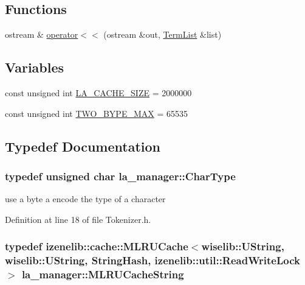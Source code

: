 \subsection*{Functions}
\begin{CompactItemize}
\item 
ostream \& \hyperlink{namespacela__manager_85370bde9cbbf78fdda59928e482fb4b}{operator$<$$<$} (ostream \&out, \hyperlink{namespacela__manager_06c0aab93982ee3ebc3ef9d0419e619a}{TermList} \&list)
\end{CompactItemize}
\subsection*{Variables}
\begin{CompactItemize}
\item 
const unsigned int \hyperlink{namespacela__manager_a750d488a0f8a7f20ba3a0adf64b44c4}{LA\_\-CACHE\_\-SIZE} = 2000000
\item 
const unsigned int \hyperlink{namespacela__manager_209bf4bd6bbc83558619fa8b8f6dc451}{TWO\_\-BYPE\_\-MAX} = 65535
\end{CompactItemize}


\subsection{Typedef Documentation}
\hypertarget{namespacela__manager_aa4b42b4146948a208eabd25288ad99b}{
\subsubsection[{CharType}]{\setlength{\rightskip}{0pt plus 5cm}typedef unsigned char {\bf la\_\-manager::CharType}}}
\label{namespacela__manager_aa4b42b4146948a208eabd25288ad99b}


use a byte a encode the type of a character 



Definition at line 18 of file Tokenizer.h.\hypertarget{namespacela__manager_8a93c4bd160d94957812fb620225a17e}{
\subsubsection[{MLRUCacheString}]{\setlength{\rightskip}{0pt plus 5cm}typedef izenelib::cache::MLRUCache$<$wiselib::UString, wiselib::UString, {\bf StringHash}, izenelib::util::ReadWriteLock$>$ {\bf la\_\-manager::MLRUCacheString}}}
\label{namespacela__manager_8a93c4bd160d94957812fb620225a17e}




